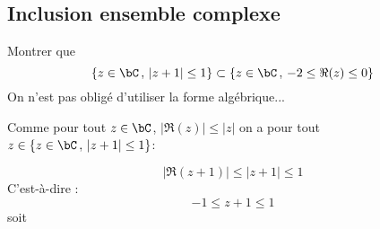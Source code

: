 \subsection{Inclusion ensemble complexe}

\begin{exercice}
Montrer que 
$$\{ z\in \bC\, , \, |z+1|\leq 1\} \subset \{ z \in \bC\, , \, -2\leq \Re(z)\leq0\}$$
\footnotesize{On n'est pas obligé d'utiliser la forme algébrique...}
\end{exercice}

\begin{correction}
 Comme pour tout $z\in \bC$, $|\Re(z)| \leq |z|$ on a pour tout $z\in \{ z\in \bC\, , \, |z+1|\leq 1\}$:
 
$$|\Re(z+1)| \leq |z+1|\leq 1$$
C'est-à-dire :
$$-1\leq z+1\leq 1$$
soit 
\begin{center}
\end{center}
\end{correction}
